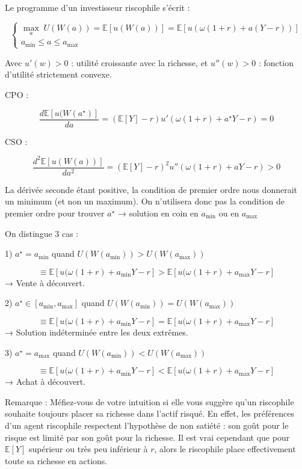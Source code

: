 \documentclass[a4paper, 12pt]{report}
\begin{document}
Le programme d'un investisseur riscophile s'écrit :

\[
\begin{cases}
	\underset{a}\max \; U(W(a)) = \mathbb{E}[u(W(a))] = \mathbb{E}[u(\omega (1 + r) + a(Y - r))] \\
	a_{\text{min}} \leq a \leq a_{\text{max}}
\end{cases}
\]

Avec \( u'(w) > 0 \) : utilité croissante avec la richesse, et \( u''(w) > 0 \) : fonction d'utilité strictement convexe.

CPO : 

\[
\frac{d \mathbb{E}[u(W(a^{\star})]}{da} = (\mathbb{E}[Y] - r) u'(\omega(1 + r) + a^{\star} Y - r) = 0
\]

CSO :

\[
\frac{d^2 \mathbb{E}[u(W(a))]}{da^2} = (\mathbb{E}[Y] - r)^2 u''(\omega(1 + r) + a Y - r) > 0
\]

La dérivée seconde étant positive, la condition de premier ordre nous donnerait un minimum (et non un maximum). On n'utilisera donc pas la condition de premier ordre pour trouver \( a^{\star} \) → solution en coin en \( a_{\text{min}} \) ou en \( a_{\text{max}} \)

On distingue 3 cas :

1) \( a^{\star} = a_{\text{min}} \) quand \( U(W(a_{\text{min}})) > U(W(a_{\text{max}})) \)

\[
\equiv \mathbb{E}[u(\omega (1 + r) + a_{\text{min}} Y - r] > \mathbb{E}[u(\omega (1 + r) + a_{\text{max}} Y - r]
\]
→ Vente à découvert.

2) \( a^{\star} \in [a_{\text{min}}, a_{\text{max}}] \) quand \( U(W(a_{\text{min}})) = U(W(a_{\text{max}})) \)

\[
\equiv \mathbb{E}[u(\omega (1 + r) + a_{\text{min}} Y - r] = \mathbb{E}[u(\omega (1 + r) + a_{\text{max}} Y - r]
\]
→ Solution indéterminée entre les deux extrêmes.

3) \( a^{\star} = a_{\text{max}} \) quand \( U(W(a_{\text{min}})) < U(W(a_{\text{max}})) \)

\[
\equiv \mathbb{E}[u(\omega (1 + r) + a_{\text{min}} Y - r] < \mathbb{E}[u(\omega (1 + r) + a_{\text{max}} Y - r]
\]
→ Achat à découvert.

Remarque : Méfiez-vous de votre intuition si elle vous suggère qu'un riscophile souhaite toujours placer sa richesse dans l'actif risqué. En effet, les préférences d'un agent riscophile respectent l'hypothèse de non satiété : son goût pour le risque est limité par son goût pour la richesse. Il est vrai cependant que pour \( \mathbb{E}[Y] \) supérieur ou très peu inférieur à \( r \), alors le riscophile place effectivement toute sa richesse en actions.
\end{document}
